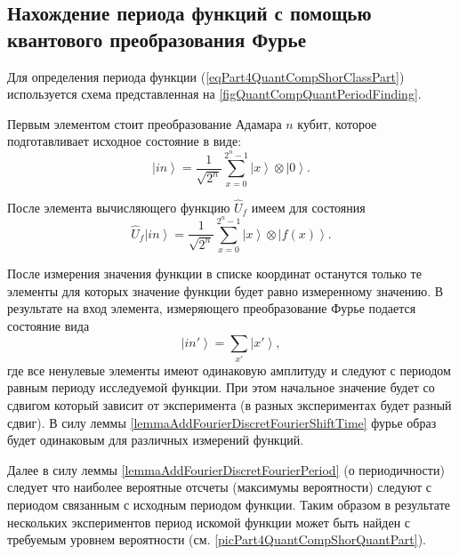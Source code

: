 \subsection{Нахождение периода функций с помощью квантового
  преобразования Фурье}

Для определения периода функции (\ref{eqPart4QuantCompShorClassPart})
используется схема представленная на
\autoref{figQuantCompQuantPeriodFinding}.



Первым элементом стоит преобразование Адамара $n$ кубит, которое
подготавливает исходное состояние в виде:
\begin{equation}
\left|in\right> = \frac{1}{\sqrt{2^n}}\sum_{x=0}^{2^n - 1} \left|x\right>
\otimes\left|0\right>.
\nonumber
\end{equation}

После элемента вычисляющего функцию $\hat{U}_f$ имеем для состояния
\begin{equation}
\hat{U}_f\left|in\right> = \frac{1}{\sqrt{2^n}}\sum_{x=0}^{2^n - 1} \left|x\right>
\otimes\left|f\left(x\right)\right>.
\nonumber
\end{equation} 



После измерения значения функции в списке координат останутся только
те элементы для которых значение функции будет равно измеренному
значению. В результате на вход элемента, измеряющего преобразование
Фурье подается состояние вида 
\begin{equation}
\left|in'\right> = \sum_{x'} \left|x'\right>,
\nonumber
\end{equation} 
где все ненулевые элементы имеют одинаковую амплитуду и следуют с
периодом равным периоду исследуемой функции. При этом начальное
значение будет со сдвигом который зависит от эксперимента (в разных
экспериментах будет разный сдвиг). В силу леммы
\ref{lemmaAddFourierDiscretFourierShiftTime} фурье образ будет
одинаковым для различных измерений функций.

Далее в силу леммы \ref{lemmaAddFourierDiscretFourierPeriod}
(о периодичности) следует что наиболее вероятные отсчеты (максимумы
вероятности) следуют с периодом связанным с исходным периодом
функции. Таким образом в результате нескольких экспериментов период
искомой функции может быть найден с требуемым уровнем вероятности
(см. \autoref{picPart4QuantCompShorQuantPart}).

